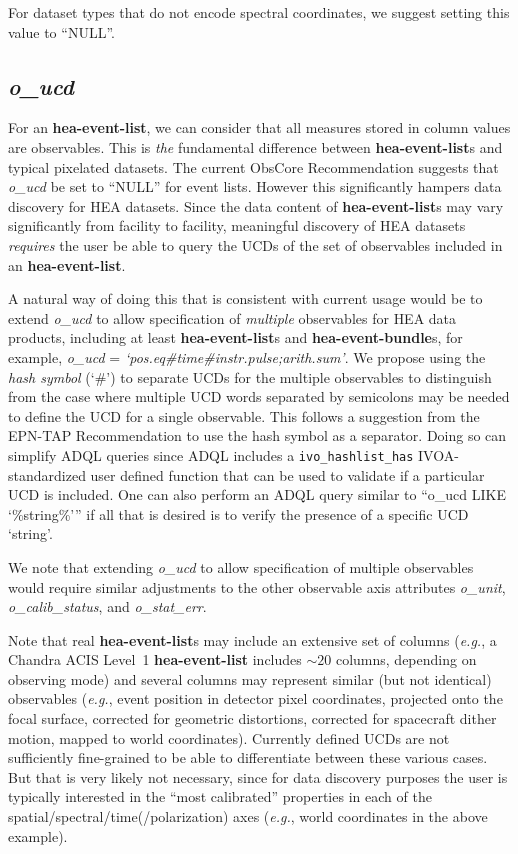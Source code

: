 \documentclass[11pt,a4paper]{ivoa}
\begin{document}
For dataset types that do not encode spectral coordinates, we suggest setting this value to ``NULL''.

\subsection{{\em o\_ucd}}

For an {\bf hea-event-list}, we can consider that all measures stored in column values are observables. This is {\em the\/} fundamental difference between {\bf hea-event-list}s and typical pixelated datasets. The current ObsCore Recommendation suggests that {\em o\_ucd\/} be set to ``NULL'' for event lists. However this significantly hampers data discovery for \gls{HEA} datasets. Since the data content of {\bf hea-event-list}s may vary significantly from facility to facility, meaningful discovery of \gls{HEA} datasets {\em requires\/} the user be able to query the UCDs of the set of observables included in an {\bf hea-event-list}.

A natural way of doing this that is consistent with current usage would be to extend {\em o\_ucd\/} to allow specification of {\em multiple\/} observables for \gls{HEA} data products, including at least {\bf hea-event-list}s and {\bf hea-event-bundle}s, for example, {\em o\_ucd\/} =  {\em `pos.eq\#time\#instr.pulse;arith.sum'\/}.  We propose using the {\em hash symbol\/} (`\#') to separate UCDs for the multiple observables to distinguish from the case where multiple UCD words separated by semicolons may be needed to define the UCD for a single observable.  This follows a suggestion from the EPN-TAP Recommendation \citep{2022ivoa.spec.0822E} to use the hash symbol as a separator. Doing so can simplify ADQL queries since ADQL includes a {\tt ivo\_hashlist\_has} IVOA-standardized user defined function that can be used to validate if a particular UCD is included.  One can also perform an ADQL query similar to ``o\_ucd LIKE `\%string\%'\null'' if all that is desired is to verify the presence of a specific UCD `string'.

We note that extending {\em o\_ucd\/} to allow specification of multiple observables would require similar adjustments to the other observable axis attributes {\em o\_unit\/}, {\em o\_calib\_status\/}, and {\em o\_stat\_err\/}.

Note that real {\bf hea-event-list}s may include an extensive set of columns ({\em e.g.\/}, a Chandra ACIS Level~1 {\bf hea-event-list} includes $\sim\!20$ columns, depending on observing mode) and several columns may represent similar (but not identical) observables ({\em e.g.\/}, event position in detector pixel coordinates, projected onto the focal surface, corrected for geometric distortions, corrected for spacecraft dither motion, mapped to world coordinates).  Currently defined UCDs are not sufficiently fine-grained to be able to differentiate between these various cases. But that is very likely not necessary, since for data discovery purposes the user is typically interested in the ``most calibrated'' properties in each of the spatial/spectral/time(/polarization) axes ({\em e.g.\/}, world coordinates in the above example).
\end{document}
